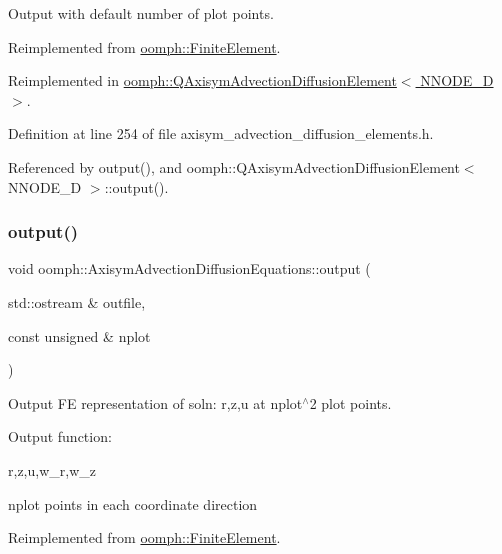 Output with default number of plot points. 



Reimplemented from \hyperlink{classoomph_1_1FiniteElement_a2ad98a3d2ef4999f1bef62c0ff13f2a7}{oomph\+::\+Finite\+Element}.



Reimplemented in \hyperlink{classoomph_1_1QAxisymAdvectionDiffusionElement_a398cd25b07bc4709163369e2db6e8202}{oomph\+::\+Q\+Axisym\+Advection\+Diffusion\+Element$<$ N\+N\+O\+D\+E\+\_\+D $>$}.



Definition at line 254 of file axisym\+\_\+advection\+\_\+diffusion\+\_\+elements.\+h.



Referenced by output(), and oomph\+::\+Q\+Axisym\+Advection\+Diffusion\+Element$<$ N\+N\+O\+D\+E\+\_\+D $>$\+::output().

\mbox{\label{classoomph_1_1AxisymAdvectionDiffusionEquations_a37f231fce2fd5b8bbe51899469b2896b}} 
\subsubsection{\texorpdfstring{output()}{output()}\hspace{0.1cm}{\footnotesize\ttfamily [2/4]}}
{\footnotesize\ttfamily void oomph\+::\+Axisym\+Advection\+Diffusion\+Equations\+::output (\begin{DoxyParamCaption}\item[{std\+::ostream \&}]{outfile,  }\item[{const unsigned \&}]{nplot }\end{DoxyParamCaption})\hspace{0.3cm}{\ttfamily [virtual]}}



Output FE representation of soln\+: r,z,u at nplot$^\wedge$2 plot points. 

Output function\+:

r,z,u,w\+\_\+r,w\+\_\+z

nplot points in each coordinate direction 

Reimplemented from \hyperlink{classoomph_1_1FiniteElement_afa9d9b2670f999b43e6679c9dd28c457}{oomph\+::\+Finite\+Element}.



